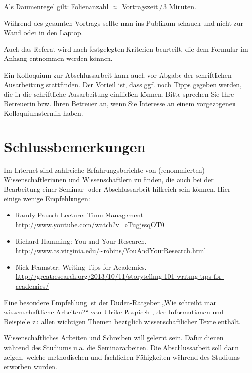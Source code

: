 \documentclass[
    fontsize=12pt,
    headings=small,
    parskip=half,           %
    bibliography=totoc,
    numbers=noenddot,       %
    open=any,               %
    ]{scrreprt}
\begin{document}
Als Daumenregel gilt: Folienanzahl $\approx$ Vortragszeit$\,/\,$3 Minuten.

Während des gesamten Vortrags sollte man ins Publikum schauen und nicht zur Wand oder in den Laptop.

Auch das Referat wird nach festgelegten Kriterien beurteilt, die dem Formular im Anhang entnommen werden können.

Ein Kolloquium zur Abschlussarbeit kann auch vor Abgabe der schriftlichen Ausarbeitung stattfinden. Der Vorteil ist, dass ggf. noch Tipps gegeben werden, die in die schriftliche Ausarbeitung einfließen können. Bitte sprechen Sie Ihre Betreuerin bzw. Ihren Betreuer an, wenn Sie Interesse an einem vorgezogenen Kolloquiumstermin haben.

\chapter{Schlussbemerkungen}

Im Internet sind zahlreiche Erfahrungsberichte von (renommierten) Wissenschaftlerinnen und Wissenschaftlern zu finden, die auch bei der Bearbeitung einer Seminar- oder Abschlussarbeit hilfreich sein können. Hier einige wenige Empfehlungen:

\begin{itemize}
	\item Randy Pausch Lecture: Time Management. \\ \url{http://www.youtube.com/watch?v=oTugjssqOT0}
	\item Richard Hamming: You and Your Research. \\ \url{http://www.cs.virginia.edu/~robins/YouAndYourResearch.html}
	\item Nick Feamster: Writing Tips for Academics. \\ \url{http://greatresearch.org/2013/10/11/storytelling-101-writing-tips-for-academics/}
\end{itemize}

Eine besondere Empfehlung ist der Duden-Ratgeber „Wie schreibt man wissenschaftliche Arbeiten?“ von Ulrike Pospiech \cite{Posp2012}, der Informationen und Beispiele zu allen wichtigen Themen bezüglich wissenschaftlicher Texte enthält.

Wissenschaftliches Arbeiten und Schreiben will gelernt sein. Dafür dienen während des Studiums u.a. die Seminararbeiten. Die Abschlussarbeit soll dann zeigen, welche methodischen und fachlichen Fähigkeiten während des Studiums erworben wurden. 
\end{document}
